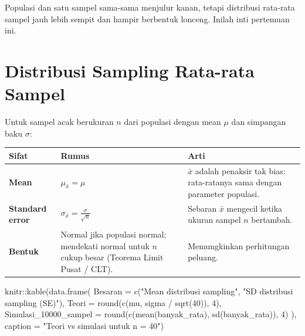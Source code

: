 \documentclass[
  indonesian,
  letterpaper,
]{book}
\newenvironment{Shaded}{\begin{snugshade}}{\end{snugshade}}
\newcommand{\AttributeTok}[1]{\textcolor[rgb]{0.40,0.45,0.13}{#1}}
\newcommand{\DecValTok}[1]{\textcolor[rgb]{0.68,0.00,0.00}{#1}}
\newcommand{\FunctionTok}[1]{\textcolor[rgb]{0.28,0.35,0.67}{#1}}
\newcommand{\NormalTok}[1]{\textcolor[rgb]{0.00,0.23,0.31}{#1}}
\newcommand{\SpecialCharTok}[1]{\textcolor[rgb]{0.37,0.37,0.37}{#1}}
\newcommand{\StringTok}[1]{\textcolor[rgb]{0.13,0.47,0.30}{#1}}
\newcounter{none} %
\begin{document}
Populasi dan satu sampel sama-sama menjulur kanan, tetapi distribusi
rata-rata sampel jauh lebih sempit dan hampir berbentuk lonceng. Inilah
inti pertemuan ini.

\section{Distribusi Sampling Rata-rata
Sampel}\label{distribusi-sampling-rata-rata-sampel}

Untuk sampel acak berukuran \(n\) dari populasi dengan mean \(\mu\) dan
simpangan baku \(\sigma\):

{\def\LTcaptype{none} %
\begin{longtable}[]{@{}
  >{\raggedright\arraybackslash}p{}
  >{\raggedright\arraybackslash}p{}
  >{\raggedright\arraybackslash}p{}@{}}
\toprule\noalign{}
\begin{minipage}[b]{\linewidth}\raggedright
Sifat
\end{minipage} & \begin{minipage}[b]{\linewidth}\raggedright
Rumus
\end{minipage} & \begin{minipage}[b]{\linewidth}\raggedright
Arti
\end{minipage} \\
\midrule\noalign{}
\endhead
\bottomrule\noalign{}
\endlastfoot
\textbf{Mean} & \(\mu_{\bar{x}} = \mu\) & \(\bar{x}\) adalah penaksir
tak bias: rata-ratanya sama dengan parameter populasi. \\
\textbf{Standard error} &
\(\displaystyle \sigma_{\bar{x}} = \frac{\sigma}{\sqrt{n}}\) & Sebaran
\(\bar{x}\) mengecil ketika ukuran sampel \(n\) bertambah. \\
\textbf{Bentuk} & Normal jika populasi normal; mendekati normal untuk
\(n\) cukup besar (Teorema Limit Pusat / CLT). & Memungkinkan
perhitungan peluang. \\
\end{longtable}
}

\begin{Shaded}
\begin{Highlighting}[]
\NormalTok{knitr}\SpecialCharTok{::}\FunctionTok{kable}\NormalTok{(}\FunctionTok{data.frame}\NormalTok{(}
  \AttributeTok{Besaran =} \FunctionTok{c}\NormalTok{(}\StringTok{"Mean distribusi sampling"}\NormalTok{, }\StringTok{"SD distribusi sampling (SE)"}\NormalTok{),}
  \AttributeTok{Teori =} \FunctionTok{round}\NormalTok{(}\FunctionTok{c}\NormalTok{(mu, sigma }\SpecialCharTok{/} \FunctionTok{sqrt}\NormalTok{(}\DecValTok{40}\NormalTok{)), }\DecValTok{4}\NormalTok{),}
  \AttributeTok{Simulasi\_10000\_sampel =} \FunctionTok{round}\NormalTok{(}\FunctionTok{c}\NormalTok{(}\FunctionTok{mean}\NormalTok{(banyak\_rata), }\FunctionTok{sd}\NormalTok{(banyak\_rata)), }\DecValTok{4}\NormalTok{)}
\NormalTok{), }\AttributeTok{caption =} \StringTok{"Teori vs simulasi untuk n = 40"}\NormalTok{)}
\end{Highlighting}
\end{Shaded}
\end{document}
